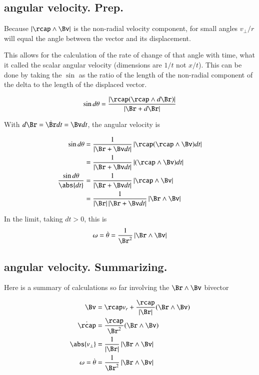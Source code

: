 \subsection{angular velocity.  Prep.}

Because $\Abs{\rcap \wedge \Bv}$ is the non-radial velocity component, for small angles
${v_\perp}/r$ will equal the angle between the vector and its displacement.

This allows for the calculation of the rate of change of that angle with time, what it called the scalar
angular velocity (dimensions are $1/t$ not $x/t$).  This can be done by taking the $\sin$ as the ratio of the
length of the non-radial component of the delta to the length of the displaced vector.

\begin{align*}
\sin d\theta &= \frac{\Abs{\rcap(\rcap \wedge d\Br)}}{\Abs{\Br + d\Br}} \\
\end{align*}

With $d\Br = \dt{\Br} dt = \Bv dt$, the angular velocity is

\begin{align*}
\sin d\theta
   &= \frac{1}{\Abs{\Br + \Bv dt}} \Abs{ \rcap (\rcap \wedge \Bv) dt } \\
   &= \frac{1}{\Abs{\Br + \Bv dt}} \Abs{ (\rcap \wedge \Bv) dt } \\
\frac{\sin d\theta}{\abs{dt}}
   &= \frac{1}{\Abs{\Br + \Bv dt}} \Abs{ \rcap \wedge \Bv } \\
   &= \frac{1}{\Abs{\Br}\Abs{\Br + \Bv dt}} \Abs{ \Br \wedge \Bv } \\
\end{align*}

In the limit, taking $dt > 0$, this is
\[
\omega = \dt{\theta} = \frac{1}{\Br^2} \Abs{ \Br \wedge \Bv }
\]

\subsection{angular velocity.  Summarizing.}

Here is a summary of calculations so far involving the $\Br \wedge \Bv$ bivector

\begin{align*}
\Bv &= \rcap v_r + \frac{\rcap}{\Abs{\Br}} (\Br \wedge \Bv) \\
\dt{\rcap} &= \frac{\rcap}{\Br^2} (\Br \wedge \Bv) \\
\abs{v_{\perp}} &= \frac{1}{\Abs{\Br}} \Abs{ \Br \wedge \Bv } \\
\omega = \dt{\theta} &= \frac{1}{\Br^2} \Abs{ \Br \wedge \Bv } \\
\end{align*}

